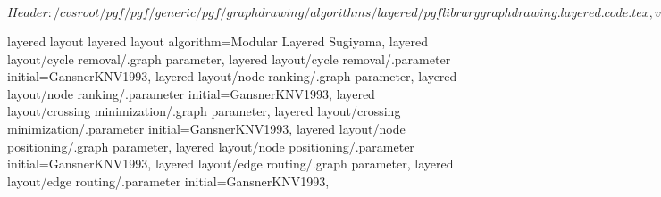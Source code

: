 %
%
%

\ProvidesFileRCS[v\pgfversion] $Header: /cvsroot/pgf/pgf/generic/pgf/graphdrawing/algorithms/layered/pgflibrarygraphdrawing.layered.code.tex,v 1.12 2012/04/05 10:04:12 tantau Exp $






%
%




%
%
\pgfgddeclarealgorithmkey
  {layered layout}
  {layered layout}
  {
    algorithm=Modular Layered Sugiyama,
    layered layout/cycle removal/.graph parameter,
    layered layout/cycle removal/.parameter initial=GansnerKNV1993,
    layered layout/node ranking/.graph parameter,
    layered layout/node ranking/.parameter initial=GansnerKNV1993,
    layered layout/crossing minimization/.graph parameter,
    layered layout/crossing minimization/.parameter initial=GansnerKNV1993,
    layered layout/node positioning/.graph parameter,
    layered layout/node positioning/.parameter initial=GansnerKNV1993,
    layered layout/edge routing/.graph parameter,
    layered layout/edge routing/.parameter initial=GansnerKNV1993,
  }




\endinput
